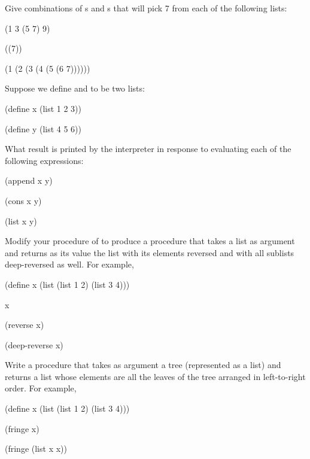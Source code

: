 \begin{exercise}
	\label{Exercise 2.25}
	Give combinations of s and s that will pick 7 from each of the following lists:
	\begin{scheme}
	  (1 3 (5 7) 9)

	  ((7))

	  (1 (2 (3 (4 (5 (6 7))))))
	\end{scheme}
\end{exercise}



\begin{exercise}
	\label{Exercise 2.26}
	Suppose we define  and  to be two lists:
	\begin{scheme}
	  (define x (list 1 2 3))

	  (define y (list 4 5 6))
	\end{scheme}
	What result is printed by the interpreter in response to evaluating each of the
	following expressions:
	\begin{scheme}
	  (append x y)

	  (cons x y)

	  (list x y)
	\end{scheme}
\end{exercise}



\begin{exercise}
	\label{Exercise 2.27}
	Modify your  procedure of  to produce a  procedure that takes a list as argument and returns as its value the list with its elements reversed and with all sublists deep-reversed as well.
	For example,
	\begin{scheme}
	  (define x (list (list 1 2) (list 3 4)))

	  x
	  ~~

	  (reverse x)
	  ~~

	  (deep-reverse x)
	  ~~
	\end{scheme}
\end{exercise}



\begin{exercise}
	\label{Exercise 2.28}
	Write a procedure  that takes as argument a tree (represented as a list) and returns a list whose elements are all the leaves of the tree arranged in left-to-right order.
	For example,
	\begin{scheme}
	  (define x (list (list 1 2) (list 3 4)))

	  (fringe x)
	  ~\outprint{(1 2 3 4)}~

	  (fringe (list x x))
	  ~\outprint{(1 2 3 4 1 2 3 4)}~
	\end{scheme}
\end{exercise}



